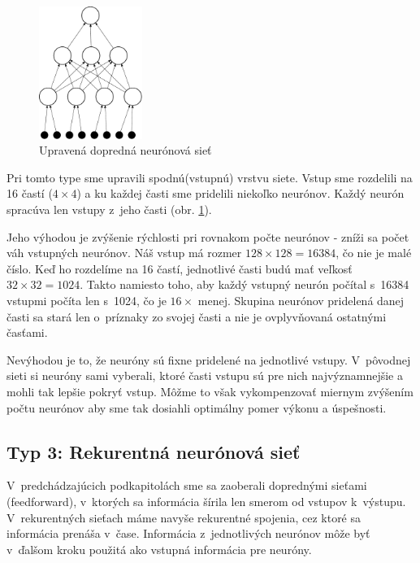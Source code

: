 \begin{figure}[h]
  \begin{center}
    \includegraphics[width=0.3\textwidth]{images/dffnn}
  \end{center}
  \caption{Upravená dopredná neurónová sieť}
  \label{fig:dffnn}
\end{figure}

Pri tomto type sme upravili spodnú(vstupnú) vrstvu siete. Vstup sme rozdelili na 16 častí ($4\times 4$) a ku každej časti sme pridelili niekoľko neurónov.
Každý neurón spracúva len vstupy z~jeho časti (obr. \ref{fig:dffnn}). 

Jeho výhodou je zvýšenie rýchlosti pri rovnakom počte neurónov - zníži sa počet váh vstupných neurónov. Náš vstup má rozmer $128\times 128 = 16384$, čo nie je malé číslo. Keď ho rozdelíme na 16 častí, jednotlivé časti budú mať veľkosť $32\times 32 = 1024$. Takto namiesto toho, aby každý vstupný neurón počítal s~16384 vstupmi počíta len s~1024, čo je $16\times$ menej. Skupina neurónov pridelená danej časti sa stará len o~príznaky zo svojej časti a nie je ovplyvňovaná ostatnými časťami. 

Nevýhodou je to, že neuróny sú fixne pridelené na jednotlivé vstupy. V~pôvodnej sieti si neuróny sami vyberali, ktoré časti vstupu sú pre nich najvýznamnejšie a mohli tak lepšie pokryť vstup. Môžme to však vykompenzovať miernym zvýšením počtu neurónov aby sme tak dosiahli optimálny pomer výkonu a úspešnosti.

\subsection{Typ 3: Rekurentná neurónová sieť}

V~predchádzajúcich podkapitolách sme sa zaoberali doprednými sieťami (feedforward), v~ktorých sa informácia šírila len smerom od vstupov k~výstupu. V~rekurentných sieťach máme navyše rekurentné spojenia, cez ktoré sa informácia prenáša v~čase. Informácia z~jednotlivých neurónov môže byť v~ďalšom kroku použitá ako vstupná informácia pre neuróny.

